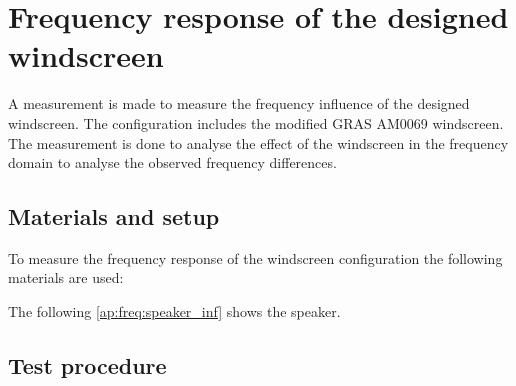 \chapter{Frequency response of the designed windscreen}\label{app:wind_inf_res}
A measurement is made to measure the frequency influence of the designed windscreen. The configuration includes the modified GRAS AM0069 windscreen. The measurement is done to analyse the effect of the windscreen in the frequency domain to analyse the observed frequency differences.





\section*{Materials and setup}
To measure the frequency response of the windscreen configuration the following materials are used:

\startequipment
{}
\stopequipment


The following \autoref{ap:freq:speaker_inf} shows the speaker.




\section*{Test procedure}



